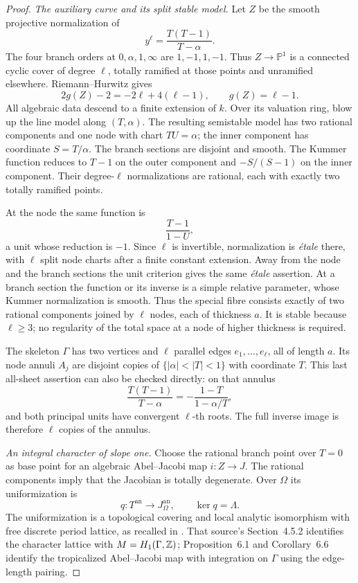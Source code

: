 \begin{proof}
\emph{The auxiliary curve and its split stable model.}
Let $Z$ be the smooth projective normalization of
\[
                         y^\ell=\frac{T(T-1)}{T-\alpha}.
\]
The four branch orders at $0,\alpha,1,\infty$ are
$1,-1,1,-1$. Thus $Z\to\mathbb P^1$ is a connected cyclic
cover of degree $\ell$, totally ramified at those points and
unramified elsewhere. Riemann--Hurwitz gives
\[
                  2g(Z)-2=-2\ell+4(\ell-1),
                     \qquad g(Z)=\ell-1.
\]
All algebraic data descend to a finite extension of $k$.
Over its valuation ring, blow up the line model along
$(T,\alpha)$. The resulting semistable model has two rational
components and one node with chart $TU=\alpha$; the inner
component has coordinate $S=T/\alpha$.
The branch sections are disjoint and smooth. The Kummer
function reduces to $T-1$ on the outer component and
$-S/(S-1)$ on the inner component. Their degree-$\ell$
normalizations are rational, each with exactly two totally
ramified points.

At the node the same function is
\[
                           \frac{T-1}{1-U},
\]
a unit whose reduction is $-1$. Since $\ell$ is invertible,
normalization is \emph{\'etale} there, with $\ell$ split node
charts after a finite constant extension. Away from the node
and the branch sections the unit criterion gives the same
\emph{\'etale} assertion. At a branch section the function or
its inverse is a simple relative parameter, whose Kummer
normalization is smooth. Thus the special fibre consists
exactly of two rational components joined by $\ell$ nodes,
each of thickness $a$. It is stable because $\ell\ge3$;
no regularity of the total space at a node of higher thickness
is required.

The skeleton $\Gamma$ has two vertices and $\ell$ parallel
edges $e_1,\ldots,e_\ell$, all of length $a$.
Its node annuli $A_j$ are disjoint copies of
$\{|\alpha|<|T|<1\}$ with coordinate $T$.
This last all-sheet assertion can also be checked directly:
on that annulus
\[
 \frac{T(T-1)}{T-\alpha}
                =-\frac{1-T}{1-\alpha/T},
\]
and both principal units have convergent $\ell$-th roots.
The full inverse image is therefore $\ell$ copies of the annulus.

\emph{An integral character of slope one.}
Choose the rational branch point over $T=0$ as base point for
an algebraic Abel--Jacobi map $i:Z\to J$.
The rational components imply that the Jacobian is totally
degenerate. Over $\Omega$ its uniformization is
\[
                q:T^{\mathrm{an}}\longrightarrow J_\Omega^{\mathrm{an}},
                  \qquad\ker q=\Lambda.
\]
The uniformization is a topological covering and local analytic
isomorphism with free discrete period lattice, as recalled in
\citet[Sections~4.1--4.2]{D_BakerRabinoff2015}.
That source's Section~4.5.2 identifies the character lattice
with $M=H_1(\Gamma,\mathbb Z)$; Proposition~6.1 and Corollary~6.6
identify the tropicalized Abel--Jacobi map with integration on
$\Gamma$ using the edge-length pairing.


\end{proof}
